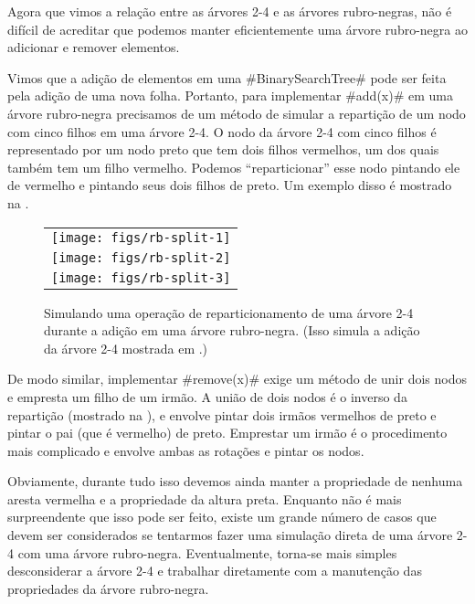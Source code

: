Agora que vimos a relação entre as árvores 2-4 e as 
árvores rubro-negras, não é difícil de acreditar que podemos manter eficientemente uma árvore rubro-negra ao adicionar e remover elementos. 

Vimos que a adição de elementos em uma 
 #BinarySearchTree#
 pode ser feita pela adição de uma nova folha. Portanto, para implementar 
#add(x)# em uma árvore rubro-negra precisamos de um método de simular
a repartição de um nodo com cinco filhos em uma 
árvore 2-4.  O nodo da árvore 2-4 com cinco filhos é representado por
um nodo preto que tem dois filhos vermelhos, um dos quais também tem um filho
vermelho. Podemos ``reparticionar'' esse nodo pintando ele de vermelho
e pintando seus dois filhos de preto. 
Um exemplo disso é mostrado na 
 .

\begin{figure}
  \begin{center}
   \begin{tabular}{c}
     \texttt{[image: figs/rb-split-1]} \\
     \texttt{[image: figs/rb-split-2]} \\
     \texttt{[image: figs/rb-split-3]} \\
   \end{tabular}
  \end{center}
  \caption[Simulando uma árvore 2-4]{Simulando uma operação de reparticionamento de uma árvore 2-4 durante a adição em uma árvore rubro-negra. (Isso simula
  a adição da árvore 2-4 mostrada em 
     .)}
\end{figure}

De modo similar, implementar 
#remove(x)# exige um método de unir dois nodos e empresta um filho de um irmão.
A união de dois nodos é o inverso da repartição (mostrado na 
), e envolve pintar dois irmãos vermelhos de preto e pintar o pai (que é vermelho) de preto. Emprestar um irmão é o procedimento mais complicado
e envolve ambas as rotações e pintar os nodos.

Obviamente, durante tudo isso devemos ainda manter a propriedade de nenhuma aresta 
vermelha e a propriedade da altura preta. Enquanto não é mais surpreendente 
que isso pode ser feito, existe um grande número de casos que devem ser considerados
se tentarmos fazer uma simulação direta de uma 
árvore 2-4 com uma árvore rubro-negra. 
Eventualmente, torna-se mais simples desconsiderar a árvore 2-4 e trabalhar
diretamente com a manutenção das propriedades da árvore rubro-negra.

